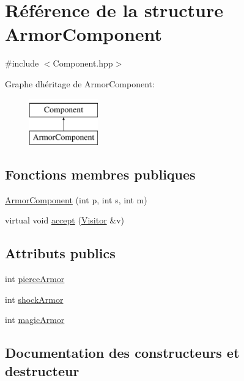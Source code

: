 \hypertarget{structArmorComponent}{}\section{Référence de la structure Armor\+Component}
\label{structArmorComponent}


{\ttfamily \#include $<$Component.\+hpp$>$}

Graphe d\textquotesingle{}héritage de Armor\+Component\+:\begin{figure}[H]
\begin{center}
\leavevmode
\includegraphics[height=2.000000cm]{structArmorComponent}
\end{center}
\end{figure}
\subsection*{Fonctions membres publiques}
\begin{DoxyCompactItemize}
\item 
\hyperlink{structArmorComponent_a836b3a9a30b3445c3abf3a7b4e56707c}{Armor\+Component} (int p, int s, int m)
\item 
virtual void \hyperlink{structArmorComponent_aac5863d4195fe056fbb0a2a0af17b6e0}{accept} (\hyperlink{classVisitor}{Visitor} \&v)
\end{DoxyCompactItemize}
\subsection*{Attributs publics}
\begin{DoxyCompactItemize}
\item 
int \hyperlink{structArmorComponent_ac039e03a0e2377aff82d95c317777ec7}{pierce\+Armor}
\item 
int \hyperlink{structArmorComponent_a2ece22c73ce63988ea38644fb1d856c5}{shock\+Armor}
\item 
int \hyperlink{structArmorComponent_a88e4b9e35be500896af52d24942e7465}{magic\+Armor}
\end{DoxyCompactItemize}


\subsection{Documentation des constructeurs et destructeur}
\mbox{\label{structArmorComponent_a836b3a9a30b3445c3abf3a7b4e56707c}} 
